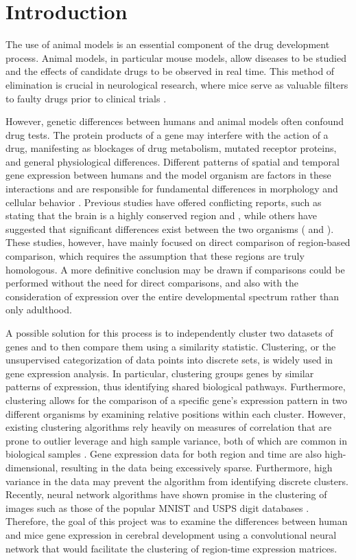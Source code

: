 \documentclass[12pt,oneside,onecolumn,a4paper]{article}
\begin{document}
\section{Introduction}

The use of animal models is an essential component of the drug development process. Animal models, in particular mouse models, allow diseases to be studied and the effects of candidate drugs to be observed in real time. This method of elimination is crucial in neurological research, where mice serve as valuable filters to faulty drugs prior to clinical trials \citep{Lin_2014}.

However, genetic differences between humans and animal models often confound drug tests. The protein products of a gene may interfere with the action of a drug, manifesting as blockages of drug metabolism, mutated receptor proteins, and general physiological differences. Different patterns of spatial and temporal gene expression between humans and the model organism are factors in these interactions and are responsible for fundamental differences in morphology and cellular behavior \citep{Burns_2015}. Previous studies have offered conflicting reports, such as stating that the brain is a highly conserved region \cite{Monaco_2015} and \cite{Strand2007ConservationOR}, while others have suggested that significant differences exist between the two organisms (\cite{Burns_2015} and \cite{Lin_2014}). These studies, however, have mainly focused on direct comparison of region-based comparison, which requires the assumption that these regions are truly homologous. A more definitive conclusion may be drawn if comparisons could be performed without the need for direct comparisons, and also with the consideration of expression over the entire developmental spectrum rather than only adulthood.

A possible solution for this process is to independently cluster two datasets of genes and to then compare them using a similarity statistic. Clustering, or the unsupervised categorization of data points into discrete sets, is widely used in gene expression analysis. In particular, clustering groups genes by similar patterns of expression, thus identifying shared biological pathways. Furthermore, clustering allows for the comparison of a specific gene's expression pattern in two different organisms by examining relative positions within each cluster. However, existing clustering algorithms rely heavily on measures of correlation that are prone to outlier leverage and high sample variance, both of which are common in biological samples \citep{how_expression_works}. Gene expression data for both region and time are also high-dimensional, resulting in the data being excessively sparse. Furthermore, high variance in the data may prevent the algorithm from identifying discrete clusters. Recently, neural network algorithms have shown promise in the clustering of images such as those of the popular MNIST and USPS digit databases \citep{Krizhevsky2012ImageNetCW}. Therefore, the goal of this project was to examine the differences between human and mice gene expression in cerebral development using a convolutional neural network that would facilitate the clustering of region-time expression matrices. 
\end{document}
